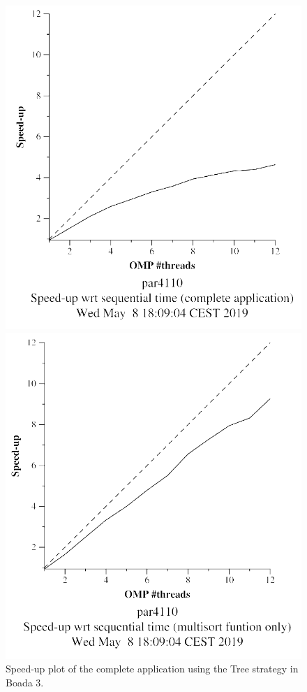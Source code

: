 \documentclass[12pt, a4paper]{article}
\begin{document}
\begin{figure}[H]
\centering
\begin{minipage}[b]{0.4\linewidth}
  \centering
  \includegraphics[scale=0.5]{./S2/S2_strong_scalability/multisort-omp-strong_boada-3_tree_complete_application}
  \caption{Speed-up plot of the complete application using the Tree strategy in Boada 3.}
  \label{fig:mandel-omp-10000-strong-21-time}
\end{minipage}%
\hspace{0.5cm}
\begin{minipage}[b]{0.4\linewidth}
  \centering
  \includegraphics[scale=0.5]{./S2/S2_strong_scalability/multisort-omp-strong_boada-3_tree_multisort_only}

\end{minipage}
\end{figure}
\end{document}
